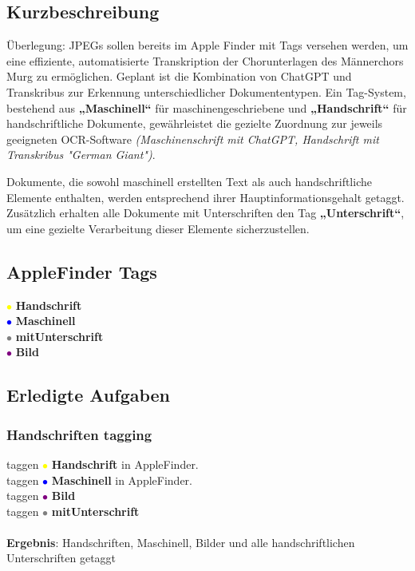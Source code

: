 \documentclass{article}
\begin{document}
\subsection*{Kurzbeschreibung}

Überlegung:
JPEGs sollen bereits im Apple Finder mit Tags versehen werden, um eine effiziente, automatisierte Transkription der Chorunterlagen des Männerchors Murg zu ermöglichen. Geplant ist die Kombination von ChatGPT und Transkribus zur Erkennung unterschiedlicher Dokumententypen. Ein Tag-System, bestehend aus \textbf{„Maschinell“} für maschinengeschriebene und \textbf{„Handschrift“} für handschriftliche Dokumente, gewährleistet die gezielte Zuordnung zur jeweils geeigneten OCR-Software \textit{(Maschinenschrift mit ChatGPT, Handschrift mit Transkribus "German Giant")}.

Dokumente, die sowohl maschinell erstellten Text als auch handschriftliche Elemente enthalten, werden entsprechend ihrer Hauptinformationsgehalt getaggt. Zusätzlich erhalten alle Dokumente mit Unterschriften den Tag \textbf{„Unterschrift“}, um eine gezielte Verarbeitung dieser Elemente sicherzustellen.

\subsection{AppleFinder Tags}

\textcolor{yellow}{\Large $\bullet$} \textbf{Handschrift} \\
\textcolor{blue}{\Large $\bullet$} \textbf{Maschinell} \\
\textcolor{gray}{\Large $\bullet$} \textbf{mitUnterschrift} \\
\textcolor{purple}{\Large $\bullet$} \textbf{Bild} \\

\subsection*{Erledigte Aufgaben}
\subsubsection*{\small Handschriften tagging}
 taggen \textcolor{yellow}{\Large $\bullet$} \textbf{Handschrift} in AppleFinder. \\
 taggen \textcolor{blue}{\Large $\bullet$} \textbf{Maschinell} in AppleFinder. \\
 taggen \textcolor{purple}{\Large $\bullet$} \textbf{Bild} \\
 taggen \textcolor{gray}{\Large $\bullet$} \textbf{mitUnterschrift} \\
\\
\textbf{Ergebnis}: Handschriften, Maschinell, Bilder und alle handschriftlichen Unterschriften getaggt
\end{document}
